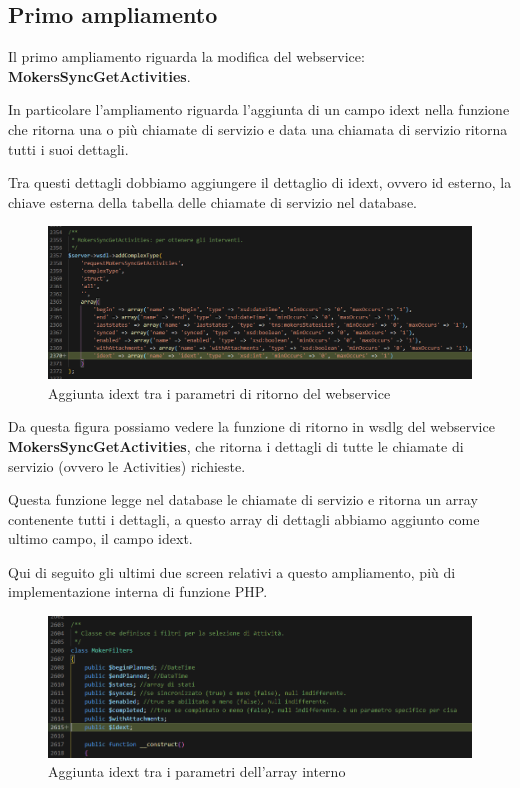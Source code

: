 \subsection{Primo ampliamento}
Il primo ampliamento riguarda la modifica del webservice:   \textbf{MokersSyncGetActivities}.


\newspace
\begin{flushleft}
	In particolare l'ampliamento riguarda l'aggiunta di un campo idext nella funzione che ritorna una o più chiamate di servizio e data una chiamata di servizio ritorna tutti i suoi dettagli.
	
	Tra questi dettagli dobbiamo aggiungere il dettaglio di idext, ovvero id esterno, la chiave esterna della tabella delle chiamate di servizio nel database.
\end{flushleft}
\newspace
\begin{figure}[!h] 
	\centering
	\includegraphics[scale = 0.4]{immagini/webservices/ampliamenti/1ampl_types_changefunction} 
	\caption{Aggiunta idext tra i parametri di ritorno del webservice}
\end{figure}
\newspace
\begin{flushleft}
	Da questa figura possiamo vedere la funzione di ritorno in \gls{wsdlg} del webservice \textbf{MokersSyncGetActivities}, che ritorna i dettagli di tutte le chiamate di servizio (ovvero le Activities) richieste. 
	
	Questa funzione legge nel database le chiamate di servizio e ritorna un array contenente tutti i dettagli, a questo array di dettagli abbiamo aggiunto come ultimo campo, il campo idext.
\end{flushleft}

\newpage

\begin{flushleft}
	Qui di seguito gli ultimi due screen relativi a questo ampliamento, più di implementazione interna di funzione PHP.
\end{flushleft}
\begin{figure}[!h] 
	\centering
	\includegraphics[scale = 0.5]{immagini/webservices/ampliamenti/1ampl_utils_filters.png}
	\caption{Aggiunta idext tra i parametri dell'array interno}
\end{figure}


